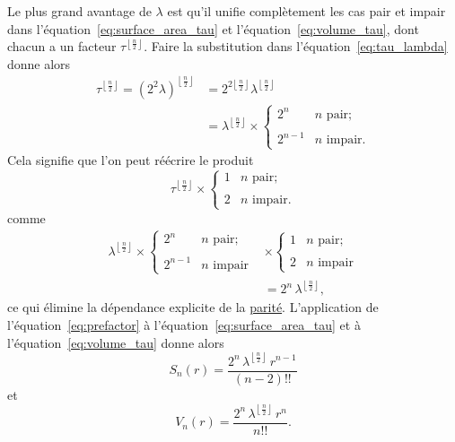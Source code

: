 Le plus grand avantage de $\lambda$ est qu'il unifie complètement les cas pair et impair dans l'équation~\eqref{eq:surface_area_tau} et l'équation~\eqref{eq:volume_tau}, dont chacun a un facteur $\tau^{\left\lfloor \frac{n}{2} \right\rfloor}$. Faire la substitution dans l'équation~\eqref{eq:tau_lambda} donne alors
\[
\begin{split}
\tau^{\left\lfloor \frac{n}{2} \right\rfloor} = (2^2\lambda)^{\left\lfloor \frac{n}{2} \right\rfloor} & = 2^{2\left\lfloor \frac{n}{2} \right\rfloor} \lambda^{\left\lfloor \frac{n}{2} \right\rfloor} \\
& = \lambda^{\left\lfloor \frac{n}{2} \right\rfloor}\times
\begin{cases}
 2^n & n \text{ pair}; \\ \\
 2^{n-1} & n \text{ impair}.
 \end{cases}
 \end{split}
\]
Cela signifie que l'on peut réécrire le produit
\[
\tau^{\left\lfloor \frac{n}{2} \right\rfloor}\times \begin{cases}
1 & n \text{ pair}; \\ \\
2 & n \text{ impair}.
\end{cases}
\]
comme
\begin{equation}
\label{eq:prefactor}
\begin{split}
\lambda^{\left\lfloor \frac{n}{2} \right\rfloor} \times
\begin{cases}
 2^n & n \text{ pair}; \\ \\
 2^{n-1} & n \text{ impair}
 \end{cases}
 & \times
\begin{cases}
 1 & n \text{ pair}; \\ \\
 2 & n \text{ impair}
 \end{cases}
\\ & = 2^n\,\lambda^{\left\lfloor \frac{n}{2} \right\rfloor},
\end{split}
\end{equation}
ce qui élimine la dépendance explicite de la \href{https://fr.wikipedia.org/wiki/Parité_(arithmétique)}{parité}. L'application de \linebreak l'équation~\eqref{eq:prefactor} à l'équation~\eqref{eq:surface_area_tau} et à l'équation~\eqref{eq:volume_tau} donne alors
\begin{equation}
\label{eq:surface_area_lambda}
S_n(r) = \frac{2^n\,\lambda^{\left\lfloor \frac{n}{2} \right\rfloor}\,r^{n-1}}{(n-2)!!}
\end{equation}
et
\begin{equation}
\label{eq:volume_lambda}
V_n(r) = \frac{2^n\,\lambda^{\left\lfloor \frac{n}{2} \right\rfloor}\,r^n}{n!!}.
\end{equation}

